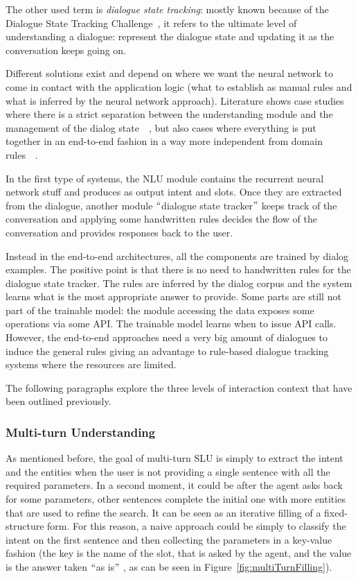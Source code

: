 The other used term is \textit{dialogue state tracking}: mostly known because of the Dialogue State Tracking Challenge~\cite{williams2013dialog}, it refers to the ultimate level of understanding a dialogue: represent the dialogue state and updating it as the conversation keeps going on.

Different solutions exist and depend on where we want the neural network to come in contact with the application logic (what to establish as manual rules and what is inferred by the neural network approach). Literature shows case studies where there is a strict separation between the understanding module and the management of the dialog state~\cite{liu2016attention}~\cite{chen2016end}, but also cases where everything is put together in an end-to-end fashion in a way more independent from domain rules~\cite{serban2016building}~\cite{eric2017key}.

In the first type of systems, the NLU module contains the recurrent neural network stuff and produces as output intent and slots. Once they are extracted from the dialogue, another module $``$dialogue state tracker$"$  keeps track of the conversation and applying some handwritten rules decides the flow of the conversation and provides responses back to the user.

Instead in the end-to-end architectures, all the components are trained by dialog examples. The positive point is that there is no need to handwritten rules for the dialogue state tracker. The rules are inferred by the dialog corpus and the system learns what is the most appropriate answer to provide. Some parts are still not part of the trainable model: the module accessing the data exposes some operations via some API. The trainable model learns when to issue API calls. However, the end-to-end approaches need a very big amount of dialogues to induce the general rules giving an advantage to rule-based dialogue tracking systems where the resources are limited.

The following paragraphs explore the three levels of interaction context that have been outlined previously.

\subsubsection{Multi-turn Understanding}
As mentioned before, the goal of multi-turn SLU is simply to extract the intent and the entities when the user is not providing a single sentence with all the required parameters. In a second moment, it could be after the agent asks back for some parameters, other sentences complete the initial one with more entities that are used to refine the search. It can be seen as an iterative filling of a fixed-structure form. For this reason, a naive approach could be simply to classify the intent on the first sentence and then collecting the parameters in a key-value fashion (the key is the name of the slot, that is asked by the agent, and the value is the answer taken $``$as is$"$ , as can be seen in Figure~\ref{fig:multiTurnFilling}).

